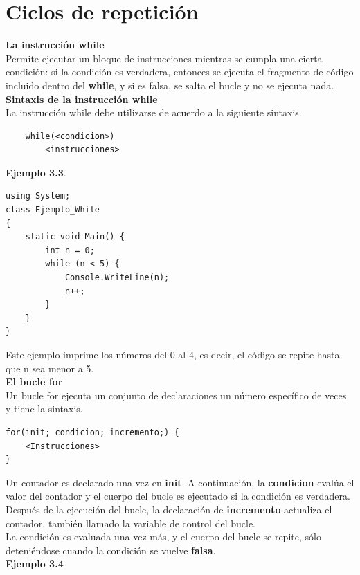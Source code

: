 \documentclass[12pt,a4paper]{report}
\begin{document}
\section{Ciclos de repetición}
\textbf{La instrucción while}\\Permite ejecutar un bloque de instrucciones mientras se cumpla una cierta condición: si la condición es verdadera, entonces se ejecuta el fragmento de código incluido dentro del \textbf{while}, y si es falsa, se salta el bucle y no se ejecuta nada.\\\textbf{Sintaxis de la instrucción while}\\La instrucción while debe utilizarse de acuerdo a la siguiente sintaxis.
\begin{lstlisting}
	while(<condicion>)
		<instrucciones>
\end{lstlisting}
\textbf{Ejemplo 3.3}.
\begin{lstlisting}
using System;
class Ejemplo_While 
{
    static void Main() {
    	int n = 0;
		while (n < 5) {
    		Console.WriteLine(n);
	    	n++;
		}
    }
}
\end{lstlisting}
Este ejemplo imprime los números del 0 al 4, es decir, el código se repite hasta que n sea menor a 5.\\\textbf{El bucle for}\\Un bucle for ejecuta un conjunto de declaraciones un número específico de veces y tiene la sintaxis.\\
\begin{lstlisting}
for(init; condicion; incremento;) {
	<Instrucciones>
}
\end{lstlisting}
Un contador es declarado una vez en \textbf{init}. A continuación, la \textbf{condicion} evalúa el valor del contador y el cuerpo del bucle es ejecutado si la condición es verdadera.\\Después de la ejecución del bucle, la declaración de \textbf{incremento} actualiza el contador, también llamado la variable de control del bucle.\\La condición es evaluada una vez más, y el cuerpo del bucle se repite, sólo deteniéndose cuando la condición se vuelve \textbf{falsa}.\\\textbf{Ejemplo 3.4}
\end{document}
